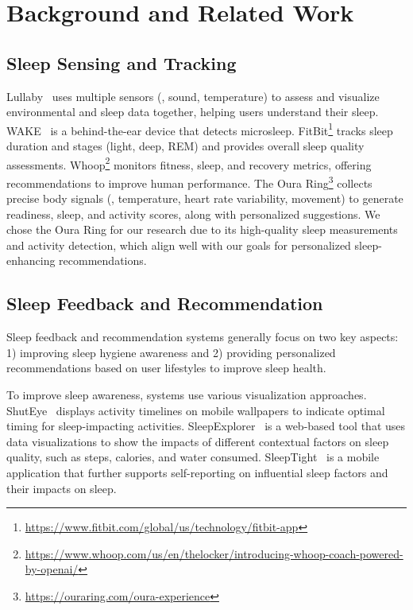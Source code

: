 \section{Background and Related Work}\label{sec.rw}

\subsection{Sleep Sensing and Tracking}\label{subsec.sleep_sensing}

Lullaby~\cite{kay2012lullaby} uses multiple sensors (\eg, sound, temperature) to assess and visualize environmental and sleep data together, helping users understand their sleep. 
WAKE~\cite{pham2020wake} is a behind-the-ear device that detects microsleep. FitBit\footnote{\url{https://www.fitbit.com/global/us/technology/fitbit-app}} tracks sleep duration and stages (light, deep, REM) and provides overall sleep quality assessments. Whoop\footnote{\url{https://www.whoop.com/us/en/thelocker/introducing-whoop-coach-powered-by-openai/}} monitors fitness, sleep, and recovery metrics, offering recommendations to improve human performance. 
The Oura Ring\footnote{\url{https://ouraring.com/oura-experience}} collects precise body signals (\eg, temperature, heart rate variability, movement) to generate readiness, sleep, and activity scores, along with personalized suggestions. 
We chose the Oura Ring for our research due to its high-quality sleep measurements and activity detection, which align well with our goals for personalized sleep-enhancing recommendations.

\subsection{Sleep Feedback and Recommendation}\label{subsec.sleep_feedback}
Sleep feedback and recommendation systems generally focus on two key aspects:
1) improving sleep hygiene awareness and 2) providing personalized recommendations based on user lifestyles to improve sleep health.

To improve sleep awareness, systems use various visualization approaches.
ShutEye~\cite{bauer2012shuteye} displays activity timelines on mobile wallpapers to indicate optimal timing for sleep-impacting activities. 
SleepExplorer~\cite{liang2016sleepexplorer} is a web-based tool that uses data visualizations to show the impacts of different contextual factors on sleep quality, such as steps, calories, and water consumed.
SleepTight~\cite{choe2015sleeptight} is a mobile application that further supports self-reporting on influential sleep factors and their impacts on sleep.

